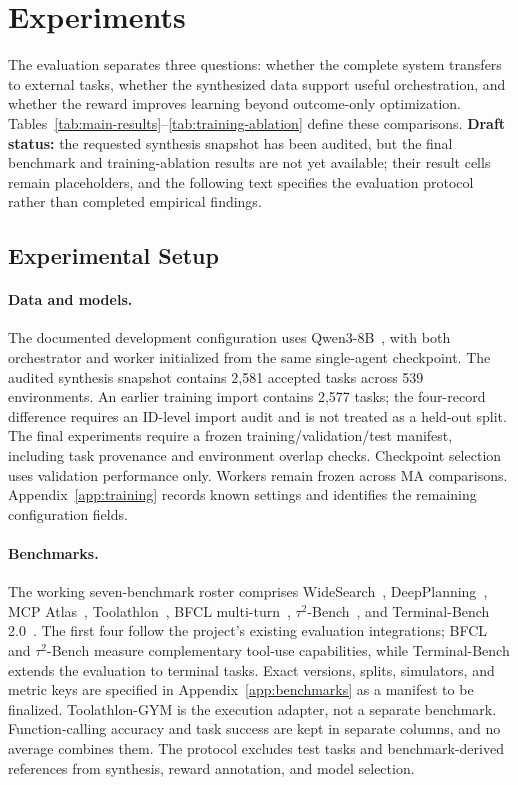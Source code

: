 \section{Experiments}
\label{sec:experiments}

The evaluation separates three questions: whether the complete system transfers to external tasks, whether the synthesized data support useful orchestration, and whether the reward improves learning beyond outcome-only optimization. Tables~\ref{tab:main-results}--\ref{tab:training-ablation} define these comparisons. \textbf{Draft status:} the requested synthesis snapshot has been audited, but the final benchmark and training-ablation results are not yet available; their result cells remain placeholders, and the following text specifies the evaluation protocol rather than completed empirical findings.

\subsection{Experimental Setup}

\paragraph{Data and models.}
The documented development configuration uses Qwen3-8B~\citep{yang2025qwen3}, with both orchestrator and worker initialized from the same single-agent checkpoint. The audited synthesis snapshot contains 2,581 accepted tasks across 539 environments. An earlier training import contains 2,577 tasks; the four-record difference requires an ID-level import audit and is not treated as a held-out split. The final experiments require a frozen training/validation/test manifest, including task provenance and environment overlap checks. Checkpoint selection uses validation performance only. Workers remain frozen across MA comparisons. Appendix~\ref{app:training} records known settings and identifies the remaining configuration fields.

\paragraph{Benchmarks.}
The working seven-benchmark roster comprises WideSearch~\citep{wong2025widesearch}, DeepPlanning~\citep{zhang2026deepplanning}, MCP Atlas~\citep{bandi2026mcpatlas}, Toolathlon~\citep{li2025toolathlon}, BFCL multi-turn~\citep{patil2025bfcl}, $\tau^2$-Bench~\citep{barres2025tau2bench}, and Terminal-Bench 2.0~\citep{merrill2026terminalbench}. The first four follow the project's existing evaluation integrations; BFCL and $\tau^2$-Bench measure complementary tool-use capabilities, while Terminal-Bench extends the evaluation to terminal tasks. Exact versions, splits, simulators, and metric keys are specified in Appendix~\ref{app:benchmarks} as a manifest to be finalized. Toolathlon-GYM is the execution adapter, not a separate benchmark. Function-calling accuracy and task success are kept in separate columns, and no average combines them. The protocol excludes test tasks and benchmark-derived references from synthesis, reward annotation, and model selection.

